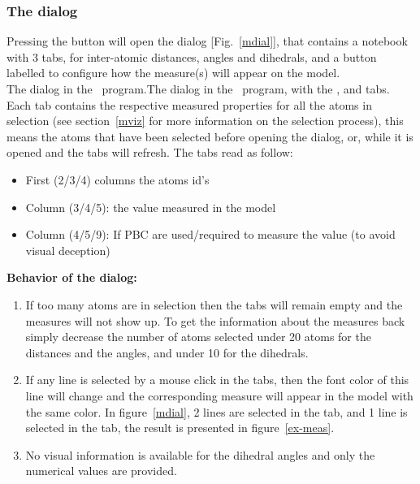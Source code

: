 \subsubsection*{The  dialog}
\label{mdw}

Pressing the  button will open the  dialog [Fig.~\ref{mdial}], that contains a notebook with 3 tabs, for inter-atomic distances, angles and dihedrals, 
and a button labelled  to configure how the measure(s) will appear on the model. \\ 
{The  dialog in the \atomes\ program.}{The  dialog in the \atomes\ program, with the ,  and  tabs.}
\laf Each tab contains the respective measured properties for all the atoms in selection (see section~\ref{mviz} for more information on the selection process), 
this means the atoms that have been selected before opening the dialog, or, while it is opened and the tabs will refresh. 
The tabs read as follow: 
\begin{itemize}
\item First (2/3/4) columns the atoms id's
\item Column (3/4/5): the value measured in the model
\item Column (4/5/9): If PBC are used/required to measure the value (to avoid visual deception) 
\end{itemize}
\clearpage
{\bf{Behavior of the  dialog:}}
\begin{enumerate}
\item If too many atoms are in selection then the tabs will remain empty and the measures will not show up. 
To get the information about the measures back simply decrease the number of atoms selected under 20 atoms for the distances and the angles, and under 10 for the dihedrals. \\
\item If any line is selected by a mouse click in the tabs, then the font color of this line will change and the corresponding measure will appear in the model with the same color. 
In figure~\ref{mdial}, 2 lines are selected in the  tab, and 1 line is selected in the  tab, the result is presented in figure~\ref{ex-meas}. \\
\item No visual information is available for the dihedral angles and only the numerical values are provided.
\end{enumerate}

